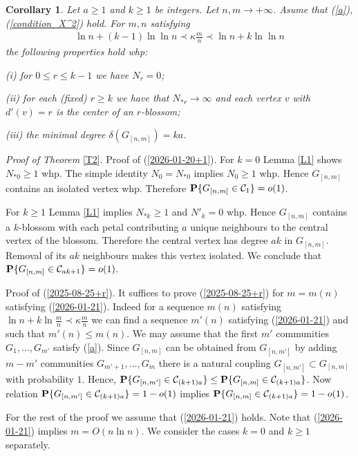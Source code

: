 \documentclass[11pt, a4paper]{article}
\newcommand{\PP}{{\bf{P}}}
\newtheorem{col}{Corollary}
\begin{document}
\begin{col}\label{col2}
Let $a\ge 1$ and $k\ge 1$ be integers. 
Let $n,m\to+\infty$.  Asume that (\ref{a}),
(\ref{condition_X^2}) hold.
For 
$m,n$ 
satisfying 
\begin{align}
\label{2026-01-14+2}
\ln n
+
(k-1)\ln\ln n
\prec
\kappa \frac{m}{n}
\prec
\ln n
+
k\ln\ln n
\end{align}
 the following 
properties hold whp: 

(i) for  $0\le r\le k-1$ we have $N_r=0$;

(ii) for each  (fixed) $r\ge k$ we have that $N_{*r}\to \infty$ and each vertex $v$ with $d'(v)=r$ is the center of an $r$-blossom;

(iii) the minimal degree $\delta(G_{[n,m]})=ka$. 
\end{col}



{\it Proof of Theorem} \ref{T2}. 
Proof of (\ref{2026-01-20+1}).
For $k=0$ Lemma \ref{L1} shows
$N_{*0}\ge 1$ whp. The simple identity $N_0=N_{*0}$ implies $N_0\ge 1$ whp. Hence $G_{[n,m]}$ contains an  isolated vertex whp. Therefore $\PP\{G_{[n,m]}\in {\cal C}_1\}=o(1)$. 

For $k\ge 1$ Lemma \ref{L1} implies
$N_{*k}\ge 1$ and $N'_{k}=0$ whp.
 Hence $G_{[n,m]}$ contains a $k$-blossom with each  petal contributing  $a$  unique neighbours to the central vertex of the blossom. Therefore 
 the central vertex has degree $ak$ in $G_{[n,m]}$. Removal of 
 its $ak$ neighbours makes this vertex isolated. We conclude 
 that
  $\PP\{G_{[n,m]}\in{\cal C}_{ak+1}\}=o(1)$. 

Proof of (\ref{2025-08-25+r}).  It suffices to prove  
(\ref{2025-08-25+r}) for $m=m(n)$ satisfying (\ref{2026-01-21}).
 Indeed  
for a sequence $m(n)$ satisfying 
$\ln n+k\ln\frac{m}{n}\prec\kappa\frac{m}{n}$
we can find a sequence $m'(n)$ satisfying 
(\ref{2026-01-21}) and
such that $m'(n)\le m(n)$. We may assume that the first $m'$ communities $G_1,\dots, G_{m'}$ satisfy (\ref{a}).
Since $G_{[n,m]}$ can be obtained from $G_{[n,m']}$ by adding $m-m'$ communities $G_{m'+1},\dots, G_{m}$ there is a natural coupling 
$G_{[n,m']}\subset G_{[n,m]}$ with probability $1$. 
Hence, $\PP\{G_{[n,m']}\in {\cal C}_{(k+1)a}\} \le 
\PP\{G_{[n,m]}\in {\cal C}_{(k+1)a}\}$. Now
relation $\PP\{G_{[n,m']}\in {\cal C}_{(k+1)a}\}=1-o(1)$ implies $\PP\{G_{[n,m]}\in {\cal C}_{(k+1)a}\}=1-o(1)$.

For the rest of the proof we assume that 
 (\ref{2026-01-21}) 
 holds. 
 Note that (\ref{2026-01-21}) implies 
$m=O(n\ln n)$. We consider the cases $k=0$ and $k\ge 1$ separately.
\end{document}
